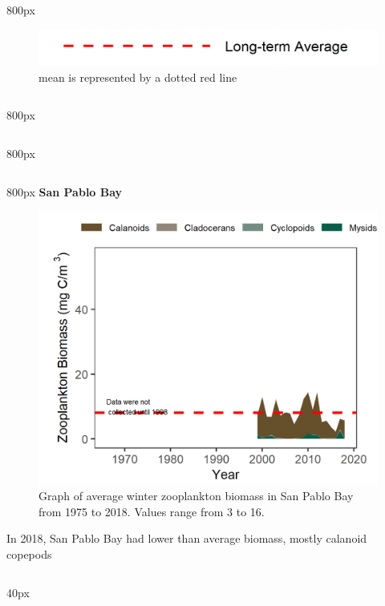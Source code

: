 \documentclass[
]{book}
\begin{document}
\begin{column}{800px\textwidth}
\begin{figure}
\includegraphics[width=15.25in]{figures/mline} \caption{mean is represented by a dotted red line}\label{fig:unnamed-chunk-164}
\end{figure}
\end{column}

\begin{column}{800px\textwidth}
\end{column}

\begin{column}{800px\textwidth}
\end{column}

\begin{column}{800px\textwidth}
\textbf{San Pablo Bay}

\begin{figure}
\includegraphics[width=15.25in]{figures/zoops_splwinter} \caption{Graph of average winter zooplankton biomass in San Pablo Bay from 1975 to 2018. Values range from 3 to 16.}\label{fig:unnamed-chunk-165}
\end{figure}

In 2018, San Pablo Bay had lower than average biomass, mostly calanoid copepods
\end{column}

\begin{column}{40px\textwidth}
~
\end{column}
\end{document}
